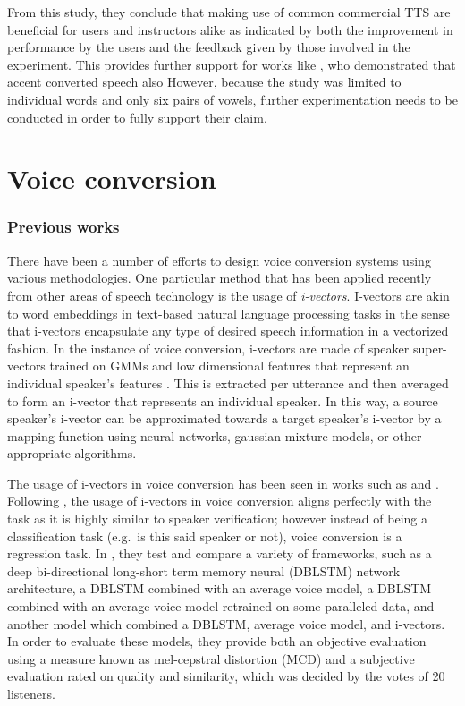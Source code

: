 \documentclass
[
    a4paper,
    twoside,
    12pt
]
{report}
\begin{document}
From this study, they conclude that making use of common commercial TTS
are beneficial for users and instructors alike as indicated by both the
improvement in performance by the users and the feedback given by those
involved in the experiment. This provides further support for works like
\parencite{felps2009}, who demonstrated that accent converted speech
also However, because the study was limited to individual words and only
six pairs of vowels, further experimentation needs to be conducted in
order to fully support their claim.

\section{Voice conversion}\label{voice-conversion}

\subsubsection*{Previous works}

There have been a number of efforts to design voice conversion systems
using various methodologies. One particular method that has been applied
recently from other areas of speech technology is the usage of
\emph{i-vectors}. I-vectors are akin to word embeddings in text-based
natural language processing tasks in the sense that i-vectors
encapsulate any type of desired speech information in a vectorized
fashion. In the instance of voice conversion, i-vectors are made of
speaker super-vectors trained on GMMs and low dimensional features that
represent an individual speaker's features \parencite{wu2016}. This is
extracted per utterance and then averaged to form an i-vector that
represents an individual speaker. In this way, a source speaker's
i-vector can be approximated towards a target speaker's i-vector by a
mapping function using neural networks, gaussian mixture models, or
other appropriate algorithms.

The usage of i-vectors in voice conversion has been seen in works such
as \textcite{wu2016} and \textcite{kinnunen2017}. Following
\textcite{kinnunen2017}, the usage of i-vectors in voice conversion
aligns perfectly with the task as it is highly similar to speaker
verification; however instead of being a classification task (e.g.~is
this said speaker or not), voice conversion is a regression task. In
\textcite{wu2016}, they test and compare a variety of frameworks, such
as a deep bi-directional long-short term memory neural (DBLSTM) network
architecture, a DBLSTM combined with an average voice model, a DBLSTM
combined with an average voice model retrained on some paralleled data,
and another model which combined a DBLSTM, average voice model, and
i-vectors. In order to evaluate these models, they provide both an
objective evaluation using a measure known as mel-cepstral distortion
(MCD) and a subjective evaluation rated on quality and similarity, which
was decided by the votes of 20 listeners.
\end{document}
